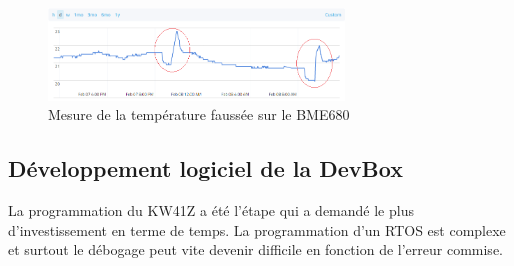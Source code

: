 \begin{figure}[ht!]
    \centering
    \includegraphics[width=0.7\textwidth]{Figures/bme680_temperature_bug.png}
    \caption{Mesure de la température faussée sur le BME680}
    \label{fig-bme680_temperature_bug}
\end{figure}

\subsection{Développement logiciel de la DevBox}

La programmation du KW41Z a été l'étape qui a demandé le plus d'investissement en terme de temps. La programmation d'un RTOS est complexe et surtout le débogage peut vite devenir difficile en fonction de l'erreur commise. \\

